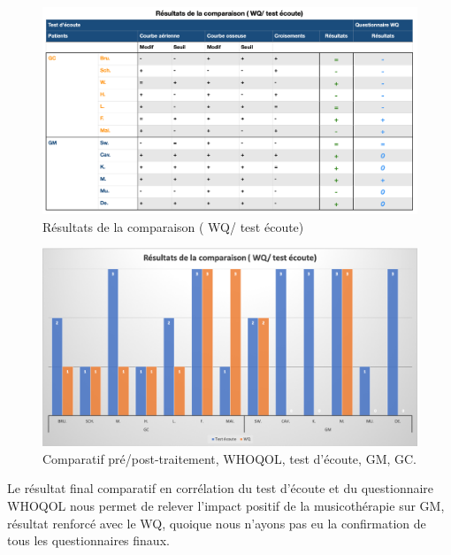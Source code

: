   \begin{figure}
  	\centering
  	\includegraphics[width=\linewidth]{images/graphiques/comparaison_pre_post.png}
  	\caption[Résultats de la comparaison ( WQ/ test écoute)]{Résultats de la comparaison ( WQ/ test 
  	écoute)}
  	
  	\label{comparaison_pre_post}
  \end{figure}
  \begin{figure}
  	\centering
  	\includegraphics[width=\linewidth]{images/graphiques/comparatifWQecoute.png}
  	\caption[Comparatif résultats pré/post]{Comparatif
  		pré/post-traitement, WHOQOL, test d'écoute, GM, GC.}
  	
  	\label{comparaison_pre_post}
  \end{figure}
  
  Le résultat final comparatif en corrélation du test d'écoute et du questionnaire WHOQOL nous permet
  de relever l'impact positif de la
  musicothérapie sur GM, résultat renforcé
  avec le WQ, quoique  nous n'ayons pas eu la confirmation de tous les questionnaires finaux.
  
